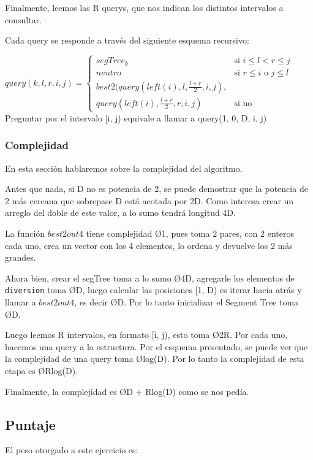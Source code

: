 Finalmente, leemos las R querys, que nos indican los distintos intervalos a consultar.

Cada query se responde a trav\'es del siguiente esquema recursivo:

$query(k, l, r, i, j) =
\left\{
	\begin{array}{ll}
		segTree_k  & \mbox{si } i \leq l < r \leq j \\
		neutro & \mbox{si } r \leq i \mbox{ o } j \leq l \\
		best2(query(left(i), l, \frac{l+r}{2}, i, j), \\ query(left(i), \frac{l+r}{2}, r, i, j) & \mbox{si no}
	\end{array}
\right. $ \\

Preguntar por el intervalo [i, j) equivale a llamar a query(1, 0, D, i, j)

\subsubsection{Complejidad}
En esta secci\'on hablaremos sobre la complejidad del algoritmo.

Antes que nada, si D no es potencia de 2, se puede demostrar que la potencia de 2 m\'as cercana que sobrepase D est\'a acotada por 2D. Como interesa crear un arreglo del doble de este valor, a lo sumo tendr\'a longitud 4D.

La funci\'on $best2out4$ tiene complejidad \O{1}, pues toma 2 pares, con 2 enteros cada uno, crea un vector con los 4 elementos, lo ordena y devuelve los 2 m\'as grandes.

Ahora bien, crear el segTree toma a lo sumo \O{4D}, agregarle los elementos de \texttt{diversion} toma \O{D}, luego calcular las posiciones [1, D) es iterar hacia atr\'as y llamar a $best2out4$, es decir \O{D}. Por lo tanto inicializar el Segment Tree toma \O{D}.

Luego leemos R intervalos, en formato [i, j), esto toma \O{2R}. Por cada uno, hacemos una query a la estructura. Por el esquema presentado, se puede ver que la complejidad de una query toma \O{log(D)}. Por lo tanto la complejidad de esta etapa es \O{Rlog(D)}.

Finalmente, la complejidad es \O{D + Rlog(D)} como se nos ped\'ia.

\subsection{Puntaje}
El peso otorgado a este ejercicio es:
